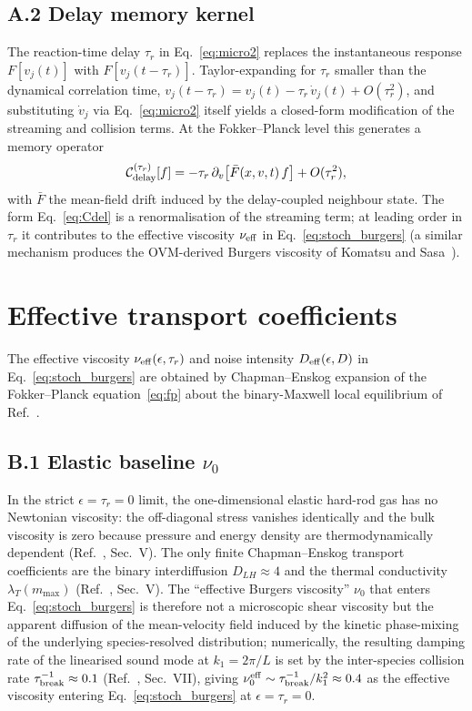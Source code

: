 \documentclass[aps,pre,twocolumn,superscriptaddress,longbibliography,floatfix]{revtex4-2}
\begin{document}
\subsection*{A.2 Delay memory kernel}

The reaction-time delay $\tau_r$ in
Eq.~\eqref{eq:micro2} replaces the instantaneous response
$F[v_j(t)]$ with $F[v_j(t-\tau_r)]$. Taylor-expanding for
$\tau_r$ smaller than the dynamical correlation time,
$v_j(t-\tau_r) = v_j(t) - \tau_r\,\dot v_j(t)
+ O(\tau_r^2)$, and substituting $\dot v_j$ via
Eq.~\eqref{eq:micro2} itself yields a closed-form
modification of the streaming and collision terms. At the
Fokker--Planck level this generates a memory operator
\begin{equation}
\mathcal{C}_{\rm delay}^{(\tau_r)}[f]
= -\tau_r\,\partial_v\!\left[\bar F(x,v,t)\,f\right]
+ O(\tau_r^2),
\label{eq:Cdel}
\end{equation}
with $\bar F$ the mean-field drift induced by the
delay-coupled neighbour state. The form Eq.~\eqref{eq:Cdel} is
a renormalisation of the streaming term; at leading order in
$\tau_r$ it contributes to the effective viscosity
$\nu_{\rm eff}$ in Eq.~\eqref{eq:stoch_burgers} (a similar
mechanism produces the OVM-derived Burgers viscosity of
Komatsu and Sasa~\cite{Komatsu1995}).

\section{Effective transport coefficients}
\label{app:prefactors}

The effective viscosity $\nu_{\rm eff}(\epsilon,\tau_r)$ and
noise intensity $D_{\rm eff}(\epsilon,D)$ in
Eq.~\eqref{eq:stoch_burgers} are obtained by Chapman--Enskog
expansion of the Fokker--Planck equation~\eqref{eq:fp} about
the binary-Maxwell local equilibrium of Ref.~\cite{PaperIV}.

\subsection*{B.1 Elastic baseline $\nu_0$}

In the strict $\epsilon=\tau_r=0$ limit, the
one-dimensional elastic hard-rod gas has no Newtonian
viscosity: the off-diagonal stress vanishes identically
and the bulk viscosity is zero because pressure and energy
density are thermodynamically dependent
(Ref.~\cite{PaperV}, Sec.~V). The only finite Chapman--Enskog
transport coefficients are the binary interdiffusion
$D_{LH}\approx 4$ and the thermal conductivity
$\lambda_T(m_{\max})$ (Ref.~\cite{PaperV}, Sec.~V). The
``effective Burgers viscosity'' $\nu_0$ that enters
Eq.~\eqref{eq:stoch_burgers} is therefore not a microscopic
shear viscosity but the apparent diffusion of the
mean-velocity field induced by the kinetic phase-mixing of
the underlying species-resolved distribution; numerically,
the resulting damping rate of the linearised sound mode at
$k_1=2\pi/L$ is set by the inter-species collision rate
$\tau_{\rm break}^{-1}\approx 0.1$
(Ref.~\cite{PaperV}, Sec.~VII), giving
$\nu_0^{\rm eff}\sim\tau_{\rm break}^{-1}/k_1^2\approx 0.4$
as the effective viscosity entering
Eq.~\eqref{eq:stoch_burgers} at $\epsilon=\tau_r=0$.
\end{document}

